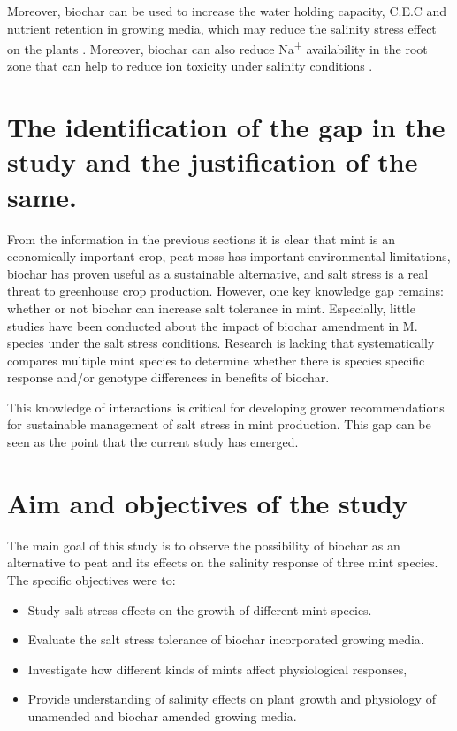 Moreover, biochar can be used to increase the water holding capacity, C.E.C and nutrient retention in growing media, which may reduce the salinity stress effect on the plants \parencite{Akhtar2021}. Moreover, biochar can also reduce Na\textsuperscript{+} availability in the root zone that can help to reduce ion toxicity under salinity conditions \parencite{Joseph2021}.

\section{The identification of the gap in the study and the justification of the same.}

From the information in the previous sections it is clear that mint is an economically important crop, peat moss has important environmental limitations, biochar has proven useful as a sustainable alternative, and salt stress is a real threat to greenhouse crop production. However, one key knowledge gap remains: whether or not biochar can increase salt tolerance in mint. Especially, little studies have been conducted about the impact of biochar amendment in M. species under the salt stress conditions. Research is lacking that systematically compares multiple mint species to determine whether there is species specific response and/or genotype differences in benefits of biochar.

This knowledge of interactions is critical for developing grower recommendations for sustainable management of salt stress in mint production. This gap can be seen as the point that the current study has emerged.

\section{Aim and objectives of the study}

The main goal of this study is to observe the possibility of biochar as an alternative to peat and its effects on the salinity response of three mint species. The specific objectives were to:
\begin{itemize}
    \item Study salt stress effects on the growth of different mint species.
    \item Evaluate the salt stress tolerance of biochar incorporated growing media.
    \item Investigate how different kinds of mints affect physiological responses,
    \item Provide understanding of salinity effects on plant growth and physiology of unamended and biochar amended growing media.
\end{itemize}
